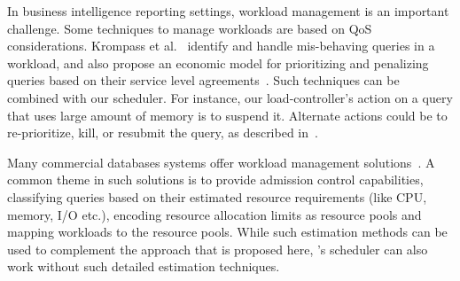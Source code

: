 In business intelligence reporting settings, workload management is an important challenge.
Some techniques to manage workloads are based on QoS considerations. 
Krompass et al.~\cite{krompass2007dynamic} identify and handle mis-behaving queries in a workload, and also propose an economic model for prioritizing and penalizing queries based on their service level agreements~\cite{krompass2006quality}.
Such techniques can be combined with our scheduler. 
For instance, our load-controller's action on a query that uses large amount of memory is to suspend it. 
Alternate actions could be to re-prioritize, kill, or resubmit the query, as described in~\cite{krompass2007dynamic}.

Many commercial databases systems offer workload management solutions~\cite{res_gov, rm, DB2, teradatawm, gpdb, hpwm}.
A common theme in such solutions is to provide admission control capabilities, classifying queries based on their estimated resource requirements (like CPU, memory, I/O etc.), encoding resource allocation limits as resource pools and mapping workloads to the resource pools. 
While such estimation methods can be used to complement the approach that is proposed here, 
\sys{}'s scheduler can also work without such detailed estimation techniques. 

